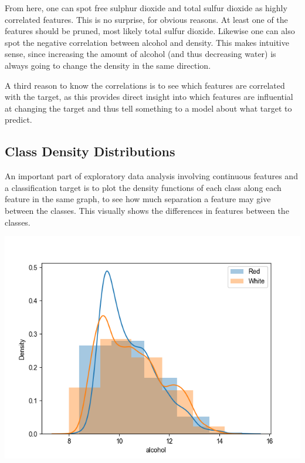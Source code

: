 \documentclass[12pt, letterpaper]{article}
\begin{document}
From here, one can spot free sulphur dioxide and total sulfur dioxide as highly correlated features. This is no surprise, for obvious reasons. At least one of the features should be pruned, most likely total sulfur dioxide. Likewise one can also spot the negative correlation between alcohol and density. This makes intuitive sense, since increasing the amount of alcohol (and thus decreasing water) is always going to change the density in the same direction.

A third reason to know the correlations is to see which features are correlated with the target, as this provides direct insight into which features are influential at changing the target and thus tell something to a model about what target to predict.

\subsection{Class Density Distributions}

An important part of exploratory data analysis involving continuous features and a classification target is to plot the density functions of each class along each feature in the same graph, to see how much separation a feature may give between the classes. This visually shows the differences in features between the classes.

\newcommand{\myscale}{.9775}
\includegraphics[scale=\myscale]{class_dist_alcohol.png}
\end{document}
